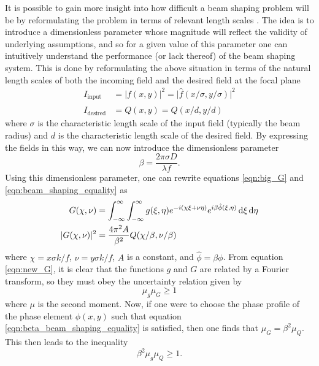 It is possible to gain more insight into how difficult a beam shaping problem will be by reformulating the problem in terms of relevant length scales \cite{dickeyLaserBeamShaping2000,romeroMathematicalAspectsLaser2010}.  The idea is to introduce a dimensionless parameter whose magnitude will reflect the validity of underlying assumptions, and so for a given value of this parameter one can intuitively understand the performance (or lack thereof) of the beam shaping system.  This is done by reformulating the above situation in terms of the natural length scales of both the incoming field and the desired field at the focal plane
\begin{align}
	I_{\mathrm{input}} &= \rvert f(x,y)\rvert^2=\rvert\hat{f}(x/\sigma,y/\sigma)\rvert^2\\
	I_{\mathrm{desired}} &= Q(x,y)=\hat{Q}(x/d,y/d)
\end{align}
where $\sigma$ is the characteristic length scale of the input field (typically the beam radius) and $d$ is the characteristic length scale of the desired field.  By expressing the fields in this way, we can now introduce the dimensionless parameter
\begin{equation}
\label{eqn:beta_parameter}
	\beta=\frac{2\pi\sigma D}{\lambda f}.
\end{equation}
Using this dimensionless parameter, one can rewrite equations \ref{eqn:big_G} and \ref{eqn:beam_shaping_equality} as
\begin{align}
\label{eqn:new_G}
	G(\chi,\nu) &= \int_{-\infty}^{\infty}\int_{-\infty}^{\infty} g(\xi,\eta)e^{-i(\chi\xi+\nu\eta)}e^{i\beta\hat{\phi}(\xi,\eta)} \mathop{}\!\mathrm{d}\xi\mathop{}\!\mathrm{d}\eta\\
\label{eqn:beta_beam_shaping_equality}
	\rvert G(\chi, \nu)\rvert^2 &= \frac{4\pi^2 A}{\beta^2}Q(\chi/\beta,\nu/\beta)
\end{align}
where $\chi=x\sigma k /f$, $\nu=y\sigma k /f$, $A$ is a constant, and $\hat{\phi} = \beta\phi$. From equation \ref{eqn:new_G}, it is clear that the functions $g$ and $G$ are related by a Fourier transform, so they must obey the uncertainty relation given by
\begin{equation}
	\mu_g \mu_G\geq 1
\end{equation}
where $\mu$ is the second moment.  Now, if one were to choose the phase profile of the phase element $\phi(x,y)$ such that equation \ref{eqn:beta_beam_shaping_equality} is satisfied, then one finds that $\mu_G=\beta^2\mu_Q$.  This then leads to the inequality
\begin{equation}
\label{eqn:beta_inequalty}
	\beta^2 \mu_g\mu_Q\geq 1.
\end{equation}
